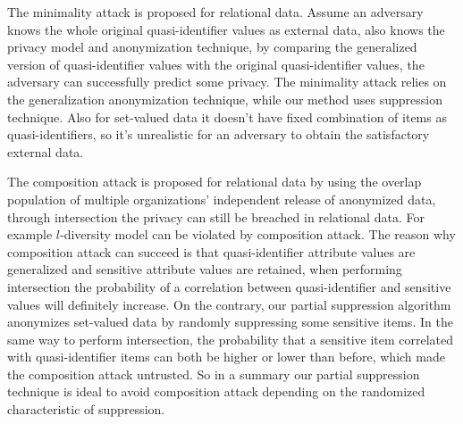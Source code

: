 The minimality attack \cite{Wong:2007:Minimality}
is proposed for relational data. Assume an adversary knows the whole original
quasi-identifier values as external data, also knows the privacy model and
anonymization technique, by comparing the generalized version of
quasi-identifier values with the original quasi-identifier values, the
adversary can successfully predict some privacy. The minimality attack relies
on the generalization anonymization technique, while our method uses
suppression technique. Also for set-valued data it doesn't have fixed
combination of items as quasi-identifiers, so it's unrealistic for an
adversary to obtain the satisfactory external data. 

The composition attack
\cite{Ganta:2008:Composition} is proposed for relational data by using the
overlap population of multiple organizations' independent release of
anonymized data, through intersection the privacy can still be breached in
relational data. For example $l$-diversity \cite{Ganta:2008:Composition}
model can be violated by composition attack. The reason why composition
attack can succeed is that quasi-identifier attribute values are generalized
and sensitive attribute values are retained, when performing intersection the
probability of a correlation between quasi-identifier and sensitive values
will definitely increase. On the contrary, our partial suppression algorithm
anonymizes set-valued data by randomly suppressing some sensitive items. In
the same way to perform intersection,
 the probability that a sensitive item correlated with quasi-identifier items can
both be higher or lower than before, which made the composition attack
untrusted. So in a summary our partial suppression technique is ideal to
avoid composition attack depending on the randomized characteristic of
suppression.
